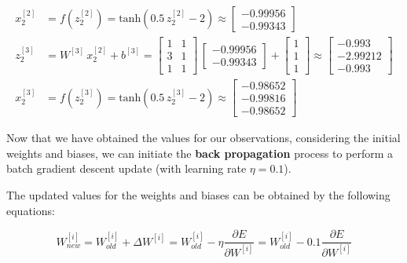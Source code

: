 \documentclass[12pt]{article}
\begin{document}
\begin{enumerate}[leftmargin=\labelsep]
\begin{align*}
          {x}^{[2]}_2 & = f\left({z}^{[2]}_2\right) = \text{tanh}\left(0.5\,{z}^{[2]}_2 - 2\right) \approx \begin{bmatrix} -0.99956 \\ -0.99343\end{bmatrix}                                        \\
          z^{[3]}_2   & = {W}^{[3]} \, {x}^{[2]}_2 + {b}^{[3]} = \begin{bmatrix} 1 & 1 \\ 3 & 1 \\ 1 & 1\end{bmatrix} \,  \begin{bmatrix} -0.99956 \\ -0.99343\end{bmatrix} +
          \begin{bmatrix} 1 \\ 1 \\ 1\end{bmatrix} \approx \begin{bmatrix} -0.993 \\ -2.99212 \\ -0.993\end{bmatrix}                                                                                \\
          {x}^{[3]}_2 & = f\left({z}^{[3]}_2\right) = \text{tanh}\left(0.5\,{z}^{[3]}_2 - 2\right) \approx \begin{bmatrix} -0.98652 \\ -0.99816 \\ -0.98652\end{bmatrix}
        \end{align*}
        \endgroup

        Now that we have obtained the values for our observations, considering the initial weights and biases, we can initiate the \textbf{back propagation} process
        to perform a batch gradient descent update (with learning rate $\eta = 0.1$).

        The updated values for the weights and biases can be obtained by the following equations:

        \begin{equation}\label{ex2-new-weight}
          W^{[i]}_{new} = W^{[i]}_{old} + \Delta W^{[i]} = W^{[i]}_{old} - \eta \frac{\partial E}{\partial W^{[i]}} = W^{[i]}_{old} - 0.1 \frac{\partial E}{\partial W^{[i]}}
        \end{equation}


\end{enumerate}
\end{document}
